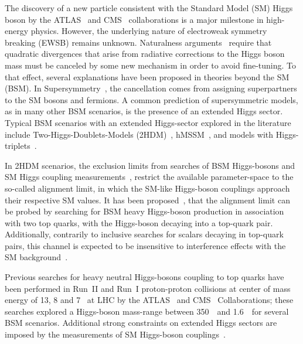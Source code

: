 The discovery of a new particle consistent with the Standard Model (SM) Higgs boson by the ATLAS~\cite{Aad:2012tfa} and CMS~\cite{Chatrchyan:2012ufa} collaborations
is a major milestone in high-energy physics. However, the underlying nature of electroweak symmetry breaking (EWSB) remains unknown.
Naturalness arguments~\cite{Susskind:1978ms} require that quadratic divergences that arise from radiative corrections to the Higgs boson mass must be canceled by some 
new mechanism in order to avoid fine-tuning. To that effect, several explanations have been proposed in theories beyond the SM (BSM).
In Supersymmetry~\cite{Fayet:1977yc,Djouadi:2005gj,Fayet:1976et}, the cancellation comes from assigning superpartners to the SM bosons and fermions.
A common prediction of supersymmetric models, as in many other BSM scenarios, is the presence of an extended Higgs sector. 
Typical BSM scenarios with an extended Higgs-sector 
explored in the literature include Two-Higgs-Doublets-Models (2HDM)~\cite{Branco:2011iw}, hMSSM~\cite{Djouadi:2015jea,Maiani:2013hud,Djouadi:2013uqa}, and models with Higgs-triplets~\cite{Lee:1973iz,Cheng:1980qt,Schechter:1980gr,Lazarides:1980nt,Mohapatra:1980yp,Magg:1980ut}. 

In 2HDM scenarios, the exclusion limits from searches of BSM Higgs-bosons and SM Higgs coupling measurements~\cite{ATLAS-CONF-2020-053}, restrict the available parameter-space to the so-called alignment limit, in which the SM-like Higgs-boson couplings approach their respective SM values. It has been proposed~\cite{Hajer:2015gka}, that the alignment limit can be probed by searching for BSM heavy Higgs-boson production in association with two top quarks, with the Higgs-boson decaying into a top-quark pair. Additionally, contrarily to inclusive searches for scalars decaying in top-quark pairs, this channel is expected to be insensitive to interference effects with the SM background~\cite{Hajer:2015gka,Gaemers:1984sj}.

Previous searches for heavy neutral Higgs-bosons coupling to top quarks have been performed in Run~II and Run~I proton-proton collisions at center of mass energy of 13, 8 and 7 \tev\ at LHC by the ATLAS~\cite{Aaboud:2017hnm,2023_SSML_4top,2018_Bjets} and CMS~\cite{Sirunyan:2019wxt,Sirunyan_2017} Collaborations; these searches explored a Higgs-boson mass-range between 350~\gev\ and 1.6~\tev\ for several BSM scenarios. Additional strong constraints on extended Higgs sectors are imposed by the measurements of SM Higgs-boson couplings~\cite{Aad:2015pla}. %
 
